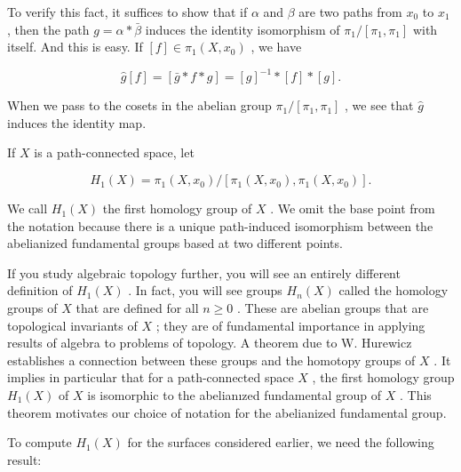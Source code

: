 \begin{theorem}
To verify this fact, it suffices to show that if \(\alpha\) and \(\beta\) are two paths from \({x}_{0}\) to \({x}_{1}\) , then the path \(g = \alpha  * \bar{\beta }\) induces the identity isomorphism of \({\pi }_{1}/\left\lbrack  {{\pi }_{1},{\pi }_{1}}\right\rbrack\) with itself. And this is easy. If \(\left\lbrack  f\right\rbrack \in  {\pi }_{1}\left( {X,{x}_{0}}\right)\) , we have

\[
\widehat{g}\left\lbrack  f\right\rbrack = \left\lbrack  {\bar{g} * f * g}\right\rbrack = {\left\lbrack  g\right\rbrack  }^{-1} * \left\lbrack  f\right\rbrack * \left\lbrack  g\right\rbrack  .
\]

When we pass to the cosets in the abelian group \({\pi }_{1}/\left\lbrack  {{\pi }_{1},{\pi }_{1}}\right\rbrack\) , we see that \(\widehat{g}\) induces the identity map.

\begin{definition} If \(X\) is a path-connected space, let

\[
{H}_{1}\left( X\right)  = {\pi }_{1}\left( {X,{x}_{0}}\right) /\left\lbrack  {{\pi }_{1}\left( {X,{x}_{0}}\right) ,{\pi }_{1}\left( {X,{x}_{0}}\right) }\right\rbrack  .
\]
\end{definition}

We call \({H}_{1}\left( X\right)\) the first homology group of \(X\) . We omit the base point from the notation because there is a unique path-induced isomorphism between the abelianized fundamental groups based at two different points.

If you study algebraic topology further, you will see an entirely different definition of \({H}_{1}\left( X\right)\) . In fact, you will see groups \({H}_{n}\left( X\right)\) called the homology groups of \(X\) that are defined for all \(n \geq  0\) . These are abelian groups that are topological invariants of \(X\) ; they are of fundamental importance in applying results of algebra to problems of topology. A theorem due to W. Hurewicz establishes a connection between these groups and the homotopy groups of \(X\) . It implies in particular that for a path-connected space \(X\) , the first homology group \({H}_{1}\left( X\right)\) of \(X\) is isomorphic to the abelianızed fundamental group of \(X\) . This theorem motivates our choice of notation for the abelianized fundamental group.
\end{theorem}

To compute \({H}_{1}\left( X\right)\) for the surfaces considered earlier, we need the following result:

